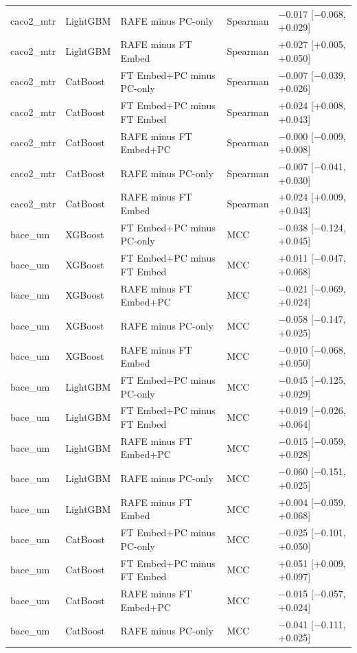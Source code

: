 \begin{longtable}{llllp{4.2cm}}
caco2\_mtr & LightGBM & RAFE minus PC-only & Spearman & $-$0.017 [$-$0.068, +0.029] \\
caco2\_mtr & LightGBM & RAFE minus FT Embed & Spearman & +0.027 [+0.005, +0.050] \\
caco2\_mtr & CatBoost & FT Embed+PC minus PC-only & Spearman & $-$0.007 [$-$0.039, +0.026] \\
caco2\_mtr & CatBoost & FT Embed+PC minus FT Embed & Spearman & +0.024 [+0.008, +0.043] \\
caco2\_mtr & CatBoost & RAFE minus FT Embed+PC & Spearman & $-$0.000 [$-$0.009, +0.008] \\
caco2\_mtr & CatBoost & RAFE minus PC-only & Spearman & $-$0.007 [$-$0.041, +0.030] \\
caco2\_mtr & CatBoost & RAFE minus FT Embed & Spearman & +0.024 [+0.009, +0.043] \\
bace\_um & XGBoost & FT Embed+PC minus PC-only & MCC & $-$0.038 [$-$0.124, +0.045] \\
bace\_um & XGBoost & FT Embed+PC minus FT Embed & MCC & +0.011 [$-$0.047, +0.068] \\
bace\_um & XGBoost & RAFE minus FT Embed+PC & MCC & $-$0.021 [$-$0.069, +0.024] \\
bace\_um & XGBoost & RAFE minus PC-only & MCC & $-$0.058 [$-$0.147, +0.025] \\
bace\_um & XGBoost & RAFE minus FT Embed & MCC & $-$0.010 [$-$0.068, +0.050] \\
bace\_um & LightGBM & FT Embed+PC minus PC-only & MCC & $-$0.045 [$-$0.125, +0.029] \\
bace\_um & LightGBM & FT Embed+PC minus FT Embed & MCC & +0.019 [$-$0.026, +0.064] \\
bace\_um & LightGBM & RAFE minus FT Embed+PC & MCC & $-$0.015 [$-$0.059, +0.028] \\
bace\_um & LightGBM & RAFE minus PC-only & MCC & $-$0.060 [$-$0.151, +0.025] \\
bace\_um & LightGBM & RAFE minus FT Embed & MCC & +0.004 [$-$0.059, +0.068] \\
bace\_um & CatBoost & FT Embed+PC minus PC-only & MCC & $-$0.025 [$-$0.101, +0.050] \\
bace\_um & CatBoost & FT Embed+PC minus FT Embed & MCC & +0.051 [+0.009, +0.097] \\
bace\_um & CatBoost & RAFE minus FT Embed+PC & MCC & $-$0.015 [$-$0.057, +0.024] \\
bace\_um & CatBoost & RAFE minus PC-only & MCC & $-$0.041 [$-$0.111, +0.025] \\

\end{longtable}

